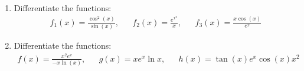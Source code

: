 \begin{enumerate}
	\item Differentiate the functions:
	\begin{align*}
	f_1(x)=\frac{\cos^2(x)}{\sin(x)},&&f_2(x)=\frac{e^{x^2}}{x},&&f_3(x)= \frac{x\cos(x)}{e^x}
	\end{align*}
	
	\item Differentiate the functions:
	\begin{align*}
	f(x)=\frac{x^2e^x}{-x\ln(x)},&& g(x)=xe^x\ln x,&& h(x)=\tan(x)e^{x}\cos(x)x^2
	\end{align*}
	
	
\end{enumerate}